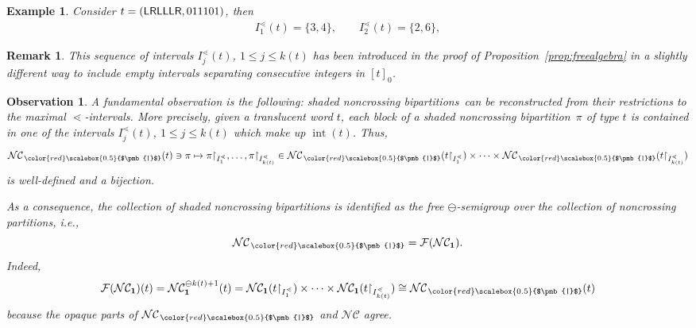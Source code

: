 \documentclass[pdftex]{sigma}
\newcommand\INT[1]{\operatorname{int}(#1)}
\renewcommand{\restriction}[2]{{#1\mathbin{\upharpoonright}_{#2}}}
\newcommand{\stdl}{\lessdot}
\newcommand{\BNCc}{\mathcal{N}\mathcal{C}}
\def\shBNCc{\BNCc_{\,{\color{red}\scalebox{0.5}{$\pmb{|}$}}}}
\newcommand\sincp{shaded noncrossing bipartition}
\newcommand\sincps{shaded noncrossing bipartitions}
\numberwithin{equation}{section}
\newtheorem{Observation}[Theorem]{Observation}
\newtheorem{Example}[Theorem]{Example}
\newtheorem{Remark}[Theorem]{Remark}
\begin{document}
\begin{Example}
	Consider $t = ({\sf LRLLLR}, 011101)$, then
	\begin{align*}
		I^{\stdl}_1(t) = \{3,4\},\qquad I^{\stdl}_2(t) = \{2,6\},
	\end{align*}
\end{Example}
\begin{Remark}
	This sequence of intervals $I_j^{\stdl}(t)$, $1 \leq j\leq k(t)$ has been introduced in the proof of Proposition~\ref{prop:freealgebra} in a slightly different way to include empty intervals separating consecutive integers in $[t]_0$.
\end{Remark}

\begin{Observation}\label{rk:fondrk}
	A fundamental observation is the following:
	\sincps~can be reconstructed from their restrictions to the maximal $\stdl$-intervals.
	More precisely, given a translucent word $t$, %
	each block of a \sincp~$\pi$ of type $t$ is contained in one of the intervals $I^{\stdl}_j(t)$, $1 \leq j\leq k(t)$ which make up $\INT{t}$. Thus,{\samepage
	\begin{equation*}
		\shBNCc(t)\ni \pi \mapsto \restriction{\pi}{I_1^{\stdl}}, \dots, \restriction{\pi}{I_{k(t)}^{\stdl}} \in \shBNCc(\restriction{t}{I_1^{\stdl}})\times\cdots\times \shBNCc(\restriction{t}{I_{k(t)}^{\stdl}})
	\end{equation*}
	is well-defined and a bijection.}

 As a consequence, the collection of shaded noncrossing bipartitions is identified as the free $\ominus$-semigroup over the collection of noncrossing partitions, i.e.,
 \[\shBNCc=\mathcal F(\BNCc_{\mathbf 1}).\]
 Indeed,
 \[\mathcal F(\BNCc_{\mathbf 1})(t)=\BNCc_{\mathbf 1}^{\ominus k(t)+1}(t)=\BNCc_{\mathbf 1}(\restriction{t}{I_1^{\stdl}})\times\cdots\times \BNCc_{\mathbf 1}(\restriction{t}{I_{k(t)}^{\stdl}})\cong \shBNCc(t)\]
 because the opaque parts of $\shBNCc$ and $\BNCc$ agree.
\end{Observation}
\end{document}
